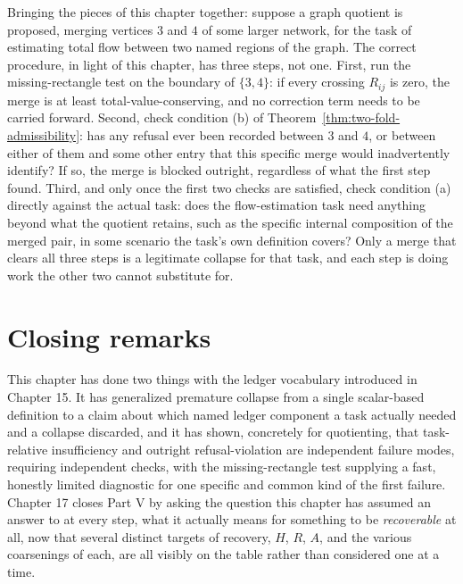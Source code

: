 \documentclass[11pt]{book}
\begin{document}
Bringing the pieces of this chapter together: suppose a graph quotient is proposed, merging vertices $3$ and $4$ of some larger network, for the task of estimating total flow between two named regions of the graph. The correct procedure, in light of this chapter, has three steps, not one. First, run the missing-rectangle test on the boundary of $\{3,4\}$: if every crossing $R_{ij}$ is zero, the merge is at least total-value-conserving, and no correction term needs to be carried forward. Second, check condition (b) of Theorem~\ref{thm:two-fold-admissibility}: has any refusal ever been recorded between $3$ and $4$, or between either of them and some other entry that this specific merge would inadvertently identify? If so, the merge is blocked outright, regardless of what the first step found. Third, and only once the first two checks are satisfied, check condition (a) directly against the actual task: does the flow-estimation task need anything beyond what the quotient retains, such as the specific internal composition of the merged pair, in some scenario the task's own definition covers? Only a merge that clears all three steps is a legitimate collapse for that task, and each step is doing work the other two cannot substitute for.

\section{Closing remarks}

This chapter has done two things with the ledger vocabulary introduced in Chapter 15. It has generalized premature collapse from a single scalar-based definition to a claim about which named ledger component a task actually needed and a collapse discarded, and it has shown, concretely for quotienting, that task-relative insufficiency and outright refusal-violation are independent failure modes, requiring independent checks, with the missing-rectangle test supplying a fast, honestly limited diagnostic for one specific and common kind of the first failure. Chapter 17 closes Part V by asking the question this chapter has assumed an answer to at every step, what it actually means for something to be \emph{recoverable} at all, now that several distinct targets of recovery, $H$, $R$, $A$, and the various coarsenings of each, are all visibly on the table rather than considered one at a time.
\end{document}
